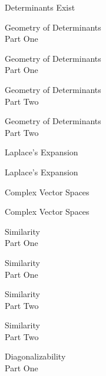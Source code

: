 \documentclass{titlescreen}
\begin{document}
\begin{videotitle}
  Determinants Exist
\end{videotitle}
\begin{videoend}
  Geometry of Determinants \\[1ex]
  Part One
\end{videoend}

\begin{videotitle}
  Geometry of Determinants \\[1ex]
  Part One
\end{videotitle}
\begin{videoend}
  Geometry of Determinants \\[1ex]
  Part Two
\end{videoend}

\begin{videotitle}
  Geometry of Determinants \\[1ex]
  Part Two
\end{videotitle}
\begin{videoend}
  Laplace's Expansion
\end{videoend}


\begin{videotitle}
  Laplace's Expansion
\end{videotitle}
\begin{videoend}
  Complex Vector Spaces
\end{videoend}




\begin{videotitle}
  Complex Vector Spaces  
\end{videotitle}
\begin{videoend}
  Similarity \\[1ex]
  Part One
\end{videoend}

\begin{videotitle}
  Similarity \\[1ex]
  Part One
\end{videotitle}
\begin{videoend}
  Similarity \\[1ex]
  Part Two
\end{videoend}

\begin{videotitle}
  Similarity \\[1ex]
  Part Two
\end{videotitle}
\begin{videoend}
  Diagonalizability \\[1ex]
  Part One
\end{videoend}
\end{document}
